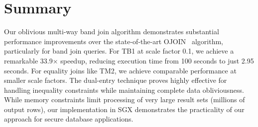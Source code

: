\section{Summary}

Our oblivious multi-way band join algorithm demonstrates substantial performance improvements over the state-of-the-art OJOIN~\cite{hu2025optimal} algorithm, particularly for band join queries. For TB1 at scale factor 0.1, we achieve a remarkable 33.9× speedup, reducing execution time from 100 seconds to just 2.95 seconds. For equality joins like TM2, we achieve comparable performance at smaller scale factors. The dual-entry technique proves highly effective for handling inequality constraints while maintaining complete data obliviousness. While memory constraints limit processing of very large result sets (millions of output rows), our implementation in SGX demonstrates the practicality of our approach for secure database applications.